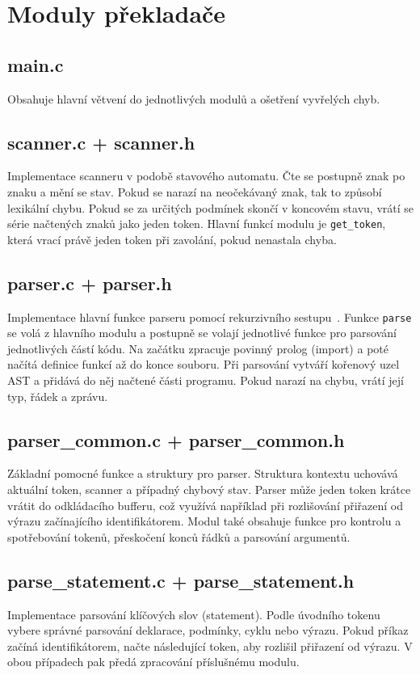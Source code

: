 \section{Moduly překladače}

\subsection*{main.c}
Obsahuje hlavní větvení do jednotlivých modulů a ošetření vyvřelých chyb.

\subsection*{scanner.c + scanner.h}
Implementace scanneru v podobě stavového automatu. Čte se postupně znak po znaku a mění se stav.
Pokud se narazí na neočekávaný znak, tak to způsobí lexikální chybu. Pokud se za určitých podmínek skončí v koncovém stavu,
vrátí se série načtených znaků jako jeden token. Hlavní funkcí modulu je \texttt{get\_token},
která vrací právě jeden token při zavolání, pokud nenastala chyba.

\subsection*{parser.c + parser.h}
Implementace hlavní funkce parseru pomocí rekurzivního sestupu~\cite{ifj_prednasky}. Funkce \texttt{parse} se volá z hlavního modulu a postupně se volají jednotlivé funkce pro parsování jednotlivých částí kódu.
Na začátku zpracuje povinný prolog (import) a poté načítá definice funkcí až do konce souboru. Při parsování vytváří kořenový uzel AST a přidává do něj načtené části programu. Pokud narazí na chybu, vrátí její typ, řádek a zprávu.

\subsection*{parser\_common.c + parser\_common.h}
Základní pomocné funkce a struktury pro parser.
Struktura kontextu uchovává aktuální token, scanner a případný chybový stav. Parser může jeden token krátce vrátit do odkládacího bufferu, což využívá například při rozlišování přiřazení od výrazu začínajícího identifikátorem. Modul také obsahuje funkce pro kontrolu a spotřebování tokenů, přeskočení konců řádků a parsování argumentů.

\subsection*{parse\_statement.c + parse\_statement.h}
Implementace parsování klíčových slov (statement).
Podle úvodního tokenu vybere správné parsování deklarace, podmínky, cyklu nebo výrazu. Pokud příkaz začíná identifikátorem, načte následující token, aby rozlišil přiřazení od výrazu. V obou případech pak předá zpracování příslušnému modulu.


